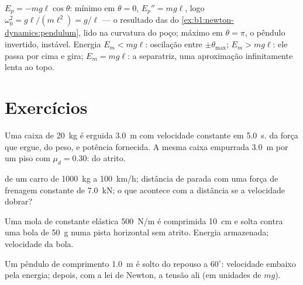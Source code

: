 \begin{example}\label{ex:b1:work-and-energy:pendulum}
$E_p = -mg\ell\cos\theta$: mínimo em $\theta = 0$, $E_p'' = mg\ell$, logo
$\omega_0^2 = g\ell/(m\ell^2) = g/\ell$ --- o resultado das  do
\cref{ex:b1:newton-dynamics:pendulum}, lido na curvatura do poço;
máximo em $\theta = \pi$, o pêndulo invertido, instável. Energia
$E_m < mg\ell$: oscilação entre $\pm\theta_{\max}$; $E_m > mg\ell$: ele
passa por cima e gira; $E_m = mg\ell$: a separatriz, uma
aproximação infinitamente lenta ao topo.
\end{example}

\section{Exercícios}

\begin{exercise}[$\star$]\label{exo:b1:work-and-energy:1}
Uma caixa de \qty{20}{kg} é erguida \qty{3.0}{m} com velocidade constante em
\qty{5.0}{s}.  da força que ergue, do peso, e potência
fornecida. A mesma caixa empurrada \qty{3.0}{m} por um piso com
$\mu_d = 0.30$:  do atrito.
\end{exercise}

\begin{exercise}[$\star$]\label{exo:b1:work-and-energy:2}
 de um carro de \qty{1000}{kg} a \qty{100}{km/h}; distância de
parada com uma força de frenagem constante de \qty{7.0}{kN}; o que acontece com
a distância se a velocidade dobrar?
\end{exercise}

\begin{exercise}[$\star$]\label{exo:b1:work-and-energy:3}
Uma mola de constante elástica \qty{500}{N/m} é comprimida \qty{10}{cm} e
solta contra uma bola de \qty{50}{g} numa pista horizontal sem atrito.
Energia armazenada; velocidade da bola.
\end{exercise}

\begin{exercise}[$\star$]\label{exo:b1:work-and-energy:4}
Um pêndulo de comprimento \qty{1.0}{m} é solto do repouso a $60^\circ$:
velocidade embaixo pela energia; depois, com a lei de Newton, a tensão
ali (em unidades de $mg$).
\end{exercise}

